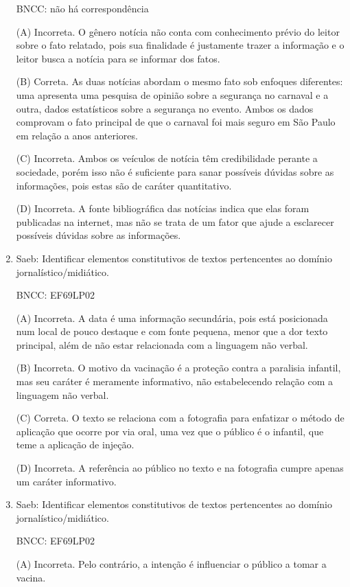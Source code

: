 \begin{enumerate}
BNCC: não há correspondência

(A) Incorreta. O gênero notícia não conta com conhecimento prévio do
leitor sobre o fato relatado, pois sua finalidade é justamente trazer a
informação e o leitor busca a notícia para se informar dos fatos.

(B) Correta. As duas notícias abordam o mesmo fato sob enfoques
diferentes: uma apresenta uma pesquisa de opinião sobre a segurança no
carnaval e a outra, dados estatísticos sobre a segurança no evento.
Ambos os dados comprovam o fato principal de que o carnaval foi mais
seguro em São Paulo em relação a anos anteriores.

(C) Incorreta. Ambos os veículos de notícia têm credibilidade perante a
sociedade, porém isso não é suficiente para sanar possíveis dúvidas
sobre as informações, pois estas são de caráter quantitativo.

(D) Incorreta. A fonte bibliográfica das notícias indica que elas foram
publicadas na internet, mas não se trata de um fator que ajude a
esclarecer possíveis dúvidas sobre as informações.

\item

Saeb: Identificar elementos constitutivos de textos pertencentes ao
domínio jornalístico/midiático.

BNCC: EF69LP02

(A) Incorreta. A data é uma informação secundária, pois está posicionada
num local de pouco destaque e com fonte pequena, menor que a dor texto
principal, além de não estar relacionada com a linguagem não verbal.

(B) Incorreta. O motivo da vacinação é a proteção contra a paralisia
infantil, mas seu caráter é meramente informativo, não estabelecendo
relação com a linguagem não verbal.

(C) Correta. O texto se relaciona com a fotografia para enfatizar o
método de aplicação que ocorre por via oral, uma vez que o público é o
infantil, que teme a aplicação de injeção.

(D) Incorreta. A referência ao público no texto e na fotografia cumpre
apenas um caráter informativo.

\item

Saeb: Identificar elementos constitutivos de textos pertencentes ao
domínio jornalístico/midiático.

BNCC: EF69LP02

(A) Incorreta. Pelo contrário, a intenção é influenciar o público a
tomar a vacina.


\end{enumerate}
